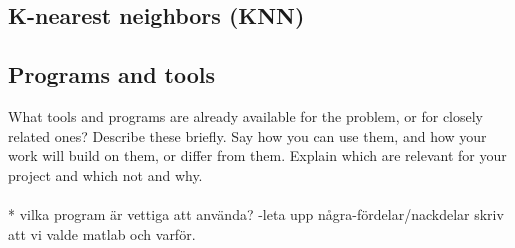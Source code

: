 \subsection{K-nearest neighbors (KNN)}



\subsection{Programs and tools}
What tools and programs are already available for the problem, or for closely related ones?
Describe these briefly. Say how you can use them, and how your work will build on them, or differ from them. Explain which are relevant for your project and which not and why.
\\\\
* vilka program är vettiga att använda? -leta upp några-fördelar/nackdelar
skriv att vi valde matlab och varför.

